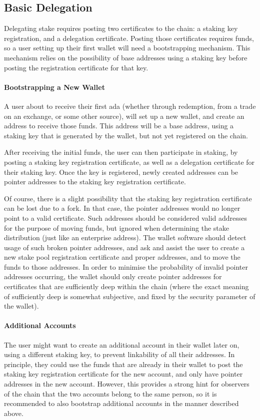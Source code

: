 \documentclass[11pt,a4paper]{article}
\begin{document}
\subsection{Basic Delegation}
\label{basic-delegation}

Delegating stake requires posting two certificates to the chain: a
staking key registration, and a delegation certificate. Posting those
certificates requires funds, so a user setting up their first wallet
will need a bootstrapping mechanism. This mechanism relies on the
possibility of base addresses using a staking key before posting the
registration certificate for that key.

\paragraph{Bootstrapping a New Wallet}
A user about to receive their first ada (whether through redemption,
from a trade on an exchange, or some other source), will set up a new
wallet, and create an address to receive those funds. This address
will be a base address, using a staking key that is generated by the
wallet, but not yet registered on the chain.

After receiving the initial funds, the user can then participate in
staking, by posting a staking key registration certificate, as well as a
delegation certificate for their staking key. Once the key is
registered, newly created addresses can be pointer addresses to the
staking key registration certificate.

Of course, there is a slight possibility that the staking key
registration certificate can be lost due to a fork. In that case, the
pointer addresses would no longer point to a valid certificate. Such
addresses should be considered valid addresses for the purpose of
moving funds, but ignored when determining the stake distribution
(just like an enterprise address). The wallet software should detect
usage of such broken pointer addresses, and ask and assist the user to
create a new stake pool registration certificate and proper addresses,
and to move the funds to those addresses. In order to minimise the
probability of invalid pointer addresses occurring, the wallet should
only create pointer addresses for certificates that are sufficiently
deep within the chain (where the exact meaning of sufficiently deep is
somewhat subjective, and fixed by the security parameter of the
wallet).

\paragraph{Additional Accounts}
The user might want to create an additional account in their wallet
later on, using a different staking key, to prevent linkability of all
their addresses. In principle, they could use the funds that are
already in their wallet to post the staking key registration certificate
for the new account, and only have pointer addresses in the new
account. However, this provides a strong hint for observers of the
chain that the two accounts belong to the same person, so it is
recommended to also bootstrap additional accounts in the manner
described above.
\end{document}
